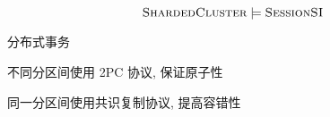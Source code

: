 
\begin{frame}{}

  \[
	\textsc{ShardedCluster} \models \textsc{SessionSI}
  \]
\end{frame}

\begin{frame}{}
  \begin{center}
    分布式事务

    \vspace{0.60cm}
    不同分区间使用 2PC 协议, 保证原子性

    \vspace{0.30cm}
    同一分区间使用共识复制协议, 提高容错性
  \end{center}
\end{frame}

\begin{frame}{}
\end{frame}

\begin{frame}{}
\end{frame}

\begin{frame}{}
\end{frame}

\begin{frame}{}
\end{frame}

